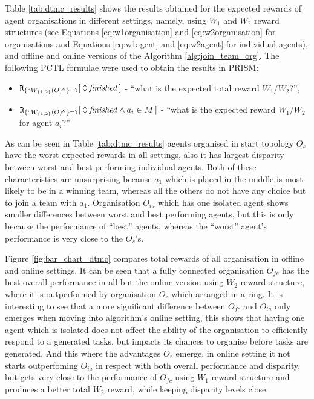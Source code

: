 \documentclass{llncs}
\begin{document}
Table \ref{tab:dtmc_results} shows the results obtained for the expected rewards of agent organisations in different settings, namely, using $W_1$ and $W_2$ reward structures (see Equations \ref{eq:w1organisation} and \ref{eq:w2organisation} for organisations and Equations \ref{eq:w1agent} and \ref{eq:w2agent} for individual agents), and offline and online versions of the Algorithm \ref{alg:join_team_org}. The following PCTL formulae were used to obtain the results in PRISM:
\begin{itemize}
 \item ${\tt R}_{\{``W_{\{1,2\}}(O)''\}=?}[\,\Diamond\,\mathit{finished}\,]$ -
``what is the expected total reward $W_1$/$W_2$?'',
 \item ${\tt R}_{\{``W_{\{1,2\}}(O)''\}=?}[\,\Diamond\,\mathit{finished} \wedge a_i \in \bar{M} \,]$ -
``what is the expected reward $W_1$/$W_2$ for agent $a_i$?''
\end{itemize}

As can be seen in Table \ref{tab:dtmc_results} agents organised in start topology $O_s$ have the worst expected rewards in all settings, also it has largest disparity between worst and best performing individual agents. Both of these characteristics are unsurprising because $a_1$ which is placed in the middle is most likely to be in a winning team, whereas all the others do not have any choice but to join a team with $a_1$. Organisation $O_{ia}$ which has one isolated agent shows smaller differences between worst and best performing agents, but this is only because the performance of ``best'' agents, whereas the ``worst'' agent's performance is very close to the $O_s$'s.

Figure \ref{fig:bar_chart_dtmc} compares total rewards of all organisation in offline and online settings. It can be seen that a fully connected organisation $O_{fc}$ has the best overall performance in all but the online version using $W_2$ reward structure, where it is outperformed by organisation $O_r$ which arranged in a ring. It is interesting to see that a more significant difference between $O_{fc}$ and $O_{ia}$ only emerges when moving into algorithm's online setting, this shows that having one agent which is isolated does not affect the ability of the organisation to efficiently respond to a generated tasks, but impacts its chances to organise before tasks are generated. And this where the advantages $O_r$ emerge, in online setting it not starts outperfoming $O_{ia}$ in respect with both overall performance and disparity, but gets very close to the performance of $O_{fc}$ using $W_1$ reward structure and produces a better total $W_2$ reward, while keeping disparity levels close.
\end{document}
